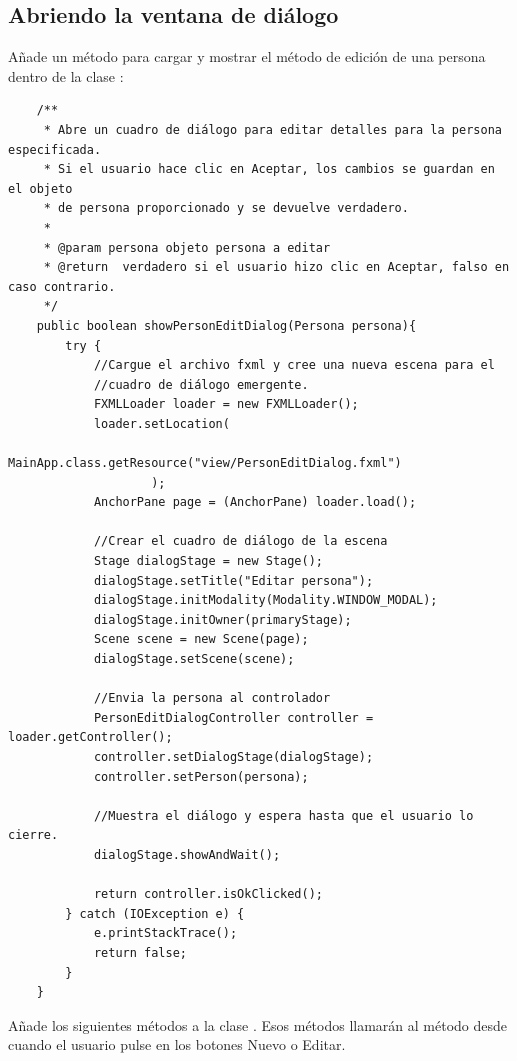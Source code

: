 \subsection{Abriendo la ventana de diálogo}
Añade un método para cargar y mostrar el método de edición de una persona dentro de la clase :
\begin{verbatim}
    /**
	 * Abre un cuadro de diálogo para editar detalles para la persona especificada.
	 * Si el usuario hace clic en Aceptar, los cambios se guardan en el objeto
	 * de persona proporcionado y se devuelve verdadero.
	 *
	 * @param persona objeto persona a editar
	 * @return  verdadero si el usuario hizo clic en Aceptar, falso en caso contrario.
	 */
	public boolean showPersonEditDialog(Persona persona){
		try {
			//Cargue el archivo fxml y cree una nueva escena para el
			//cuadro de diálogo emergente.
			FXMLLoader loader = new FXMLLoader();
			loader.setLocation(
					MainApp.class.getResource("view/PersonEditDialog.fxml")
					);
			AnchorPane page = (AnchorPane) loader.load();

			//Crear el cuadro de diálogo de la escena
			Stage dialogStage = new Stage();
			dialogStage.setTitle("Editar persona");
			dialogStage.initModality(Modality.WINDOW_MODAL);
			dialogStage.initOwner(primaryStage);
			Scene scene = new Scene(page);
			dialogStage.setScene(scene);

			//Envia la persona al controlador
			PersonEditDialogController controller = loader.getController();
			controller.setDialogStage(dialogStage);
			controller.setPerson(persona);

			//Muestra el diálogo y espera hasta que el usuario lo cierre.
			dialogStage.showAndWait();

			return controller.isOkClicked();
		} catch (IOException e) {
			e.printStackTrace();
			return false;
		}
	}
\end{verbatim}
Añade los siguientes métodos a la clase . Esos métodos llamarán al método 
 desde  cuando el usuario pulse en los botones Nuevo o Editar.\\
